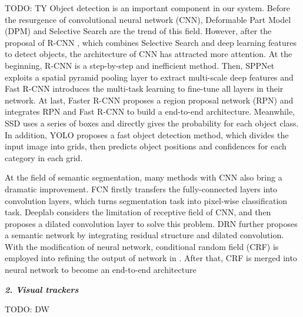 \documentclass[10pt,twocolumn,letterpaper]{article}
\begin{document}
TODO: TY
Object detection is an important component in our system. Before the resurgence of convolutional neural network (CNN), Deformable Part Model (DPM) \cite{felzenszwalb2008discriminatively} and Selective Search \cite{Uijlings2013Selective} are the trend of this field. However, after the proposal of R-CNN \cite{girshick2014rich}, which combines Selective Search and deep learning features to detect objects, the architecture of CNN has attracted more attention. At the beginning, R-CNN is a step-by-step and inefficient method. Then, SPPNet \cite{He2015Spatial} exploits a spatial pyramid pooling layer to extract multi-scale deep features and Fast R-CNN \cite{Girshick2015Fast} introduces the multi-task learning to fine-tune all layers in their network. At last, Faster R-CNN \cite{Ren2015Faster} proposes a region proposal network (RPN) and integrates RPN and Fast R-CNN to build a end-to-end architecture. Meanwhile, SSD \cite{liu2016ssd} uses a series of boxes and directly gives the probability for each object class. In addition, YOLO \cite{redmon2016you} proposes a fast object detection method, which divides the input image into grids, then predicts object positions and confidences for each category in each grid.

At the field of semantic segmentation, many methods with CNN also bring a dramatic improvement. FCN \cite{long2015fully} firstly transfers the fully-connected layers into convolution layers, which turns segmentation task into pixel-wise classification task. Deeplab \cite{chen2016deeplab} considers the limitation of receptive field of CNN, and then proposes a dilated convolution layer to solve this problem. DRN \cite{yu2017dilated} further proposes a semantic network by integrating residual structure and dilated convolution. With the modification of neural network, conditional random field (CRF) is employed into refining the output of network in \cite{chen2016deeplab}. After that, CRF is merged into neural network to become an end-to-end architecture \cite{liu2015semantic,zheng2015conditional,arnab2016higher}

\textbf{\emph{2. Visual trackers}}


TODO: DW

\end{document}

